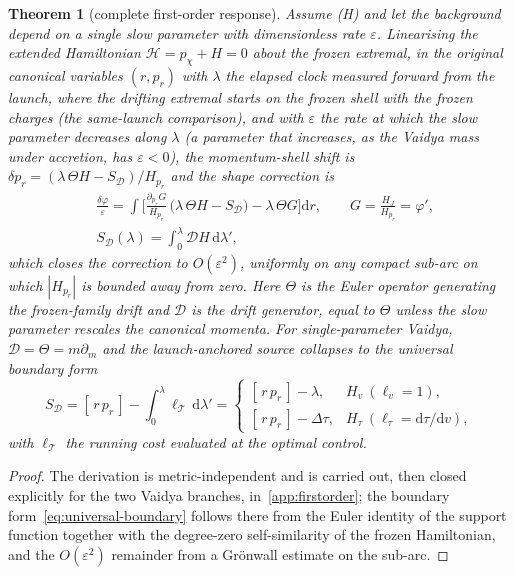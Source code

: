 \documentclass[12pt]{iopart}
\newcommand{\dd}{\mathrm{d}}
\theoremstyle{plain}
\newtheorem{theorem}{Theorem}
\theoremstyle{definition}
\theoremstyle{plain}
\theoremstyle{remark}
\newcommand{\Ithm}[1]{\setcounter{theorem}{\numexpr#1-1\relax}}
\begin{document}
\Ithm{5}
\begin{theorem}[complete first-order response]\label{thm:firstorder}
Assume (H) and let the background depend on a single slow parameter with dimensionless
rate $\varepsilon$. Linearising the extended Hamiltonian $\mathcal H=p_\chi+H=0$ about the
frozen extremal, in the original canonical variables $(r,p_r)$ with $\lambda$ the elapsed
clock measured forward from the launch, where the drifting extremal starts on the frozen
shell with the frozen charges (the same-launch comparison), and with $\varepsilon$ the rate
at which the slow parameter decreases along $\lambda$ (a parameter that increases, as the
Vaidya mass under accretion, has $\varepsilon<0$), the momentum-shell shift is
$\delta p_r=(\lambda\,\Theta H-S_{\mathcal D})/H_{p_r}$ and the shape correction is
\begin{equation}
    \begin{aligned}
    &\frac{\delta\varphi}{\varepsilon}=\int\!\Big[\frac{\partial_{p_r}G}{H_{p_r}}\,
    \big(\lambda\,\Theta H-S_{\mathcal D}\big)-\lambda\,\Theta G\Big]\dd r,\qquad
    G=\frac{H_J}{H_{p_r}}=\varphi',\\[2pt]
    &S_{\mathcal D}(\lambda)=\!\int_0^{\lambda}\!\mathcal D H\,\dd\lambda',
    \end{aligned}
    \label{eq:adiab-exact}
\end{equation}
which closes the correction to $O(\varepsilon^2)$, uniformly on any compact sub-arc on
which $|H_{p_r}|$ is bounded away from zero. Here $\Theta$ is the Euler operator
generating the frozen-family drift and $\mathcal D$ is the drift generator, equal to
$\Theta$ unless the slow parameter rescales the canonical momenta. For single-parameter
Vaidya, $\mathcal D=\Theta=m\partial_m$ and the launch-anchored source collapses to
the universal boundary form
\begin{equation}
    S_{\mathcal D}=[\,r\,p_r\,]-\int_0^{\lambda}\ell_{\mathcal T}\,\dd\lambda'
    =\begin{cases}[\,r\,p_r\,]-\lambda, & H_v\ (\ell_v=1),\\[1pt]
    [\,r\,p_r\,]-\Delta\tau, & H_\tau\ (\ell_\tau=\dd\tau/\dd v),\end{cases}
    \label{eq:universal-boundary}
\end{equation}
with $\ell_{\mathcal T}$ the running cost evaluated at the optimal control.
\end{theorem}

\begin{proof}
The derivation is metric-independent and is carried out, then closed explicitly for the
two Vaidya branches, in~\ref{app:firstorder}; the boundary form~\eqref{eq:universal-boundary}
follows there from the Euler identity of the support function together with the
degree-zero self-similarity of the frozen Hamiltonian, and the $O(\varepsilon^2)$ remainder from a
Gr\"onwall estimate on the sub-arc.
\end{proof}
\end{document}

